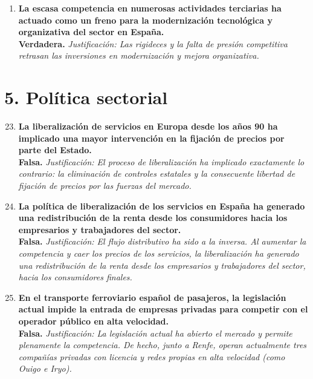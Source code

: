 \begin{enumerate}[label=\textbf{\arabic*.}]
    \item \textbf{La escasa competencia en numerosas actividades terciarias ha actuado como un freno para la modernización tecnológica y organizativa del sector en España.} \\
    \textbf{Verdadera.} \textit{Justificación: Las rigideces y la falta de presión competitiva retrasan las inversiones en modernización y mejora organizativa.}

\end{enumerate}

\section*{5. Política sectorial}

\begin{enumerate}[label=\textbf{\arabic*.}]
    \setcounter{enumi}{22}

    \item \textbf{La liberalización de servicios en Europa desde los años 90 ha implicado una mayor intervención en la fijación de precios por parte del Estado.} \\
    \textbf{Falsa.} \textit{Justificación: El proceso de liberalización ha implicado exactamente lo contrario: la eliminación de controles estatales y la consecuente libertad de fijación de precios por las fuerzas del mercado.}

    \item \textbf{La política de liberalización de los servicios en España ha generado una redistribución de la renta desde los consumidores hacia los empresarios y trabajadores del sector.} \\
    \textbf{Falsa.} \textit{Justificación: El flujo distributivo ha sido a la inversa. Al aumentar la competencia y caer los precios de los servicios, la liberalización ha generado una redistribución de la renta desde los empresarios y trabajadores del sector, hacia los consumidores finales.}

    \item \textbf{En el transporte ferroviario español de pasajeros, la legislación actual impide la entrada de empresas privadas para competir con el operador público en alta velocidad.} \\
    \textbf{Falsa.} \textit{Justificación: La legislación actual ha abierto el mercado y permite plenamente la competencia. De hecho, junto a Renfe, operan actualmente tres compañías privadas con licencia y redes propias en alta velocidad (como Ouigo e Iryo).}


\end{enumerate}
